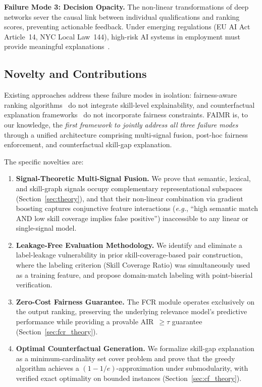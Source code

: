 \documentclass{llncs}
\begin{document}
\textbf{Failure Mode 3: Decision Opacity.} The non-linear transformations of deep networks sever the causal link between individual qualifications and ranking scores, preventing actionable feedback. Under emerging regulations (EU AI Act Article~14, NYC Local Law~144), high-risk AI systems in employment must provide meaningful explanations~\cite{wachter2017counterfactual}.

\subsection{Novelty and Contributions}

Existing approaches address these failure modes in isolation: fairness-aware ranking algorithms~\cite{zehlike2017fa} do not integrate skill-level explainability, and counterfactual explanation frameworks~\cite{mothilal2020dice} do not incorporate fairness constraints. FAIMR is, to our knowledge, the \textit{first framework to jointly address all three failure modes} through a unified architecture comprising multi-signal fusion, post-hoc fairness enforcement, and counterfactual skill-gap explanation.

The specific novelties are:

\begin{enumerate}
    \item \textbf{Signal-Theoretic Multi-Signal Fusion.} We prove that semantic, lexical, and skill-graph signals occupy complementary representational subspaces (Section~\ref{sec:theory}), and that their non-linear combination via gradient boosting captures conjunctive feature interactions (\textit{e.g.}, ``high semantic match AND low skill coverage implies false positive'') inaccessible to any linear or single-signal model.

    \item \textbf{Leakage-Free Evaluation Methodology.} We identify and eliminate a label-leakage vulnerability in prior skill-coverage-based pair construction, where the labeling criterion (Skill Coverage Ratio) was simultaneously used as a training feature, and propose domain-match labeling with point-biserial verification.

    \item \textbf{Zero-Cost Fairness Guarantee.} The FCR module operates exclusively on the output ranking, preserving the underlying relevance model's predictive performance while providing a provable AIR~$\geq \tau$ guarantee (Section~\ref{sec:fcr_theory}).

    \item \textbf{Optimal Counterfactual Generation.} We formalize skill-gap explanation as a minimum-cardinality set cover problem and prove that the greedy algorithm achieves a $(1 - 1/e)$-approximation under submodularity, with verified exact optimality on bounded instances (Section~\ref{sec:cf_theory}).
\end{enumerate}
\end{document}
